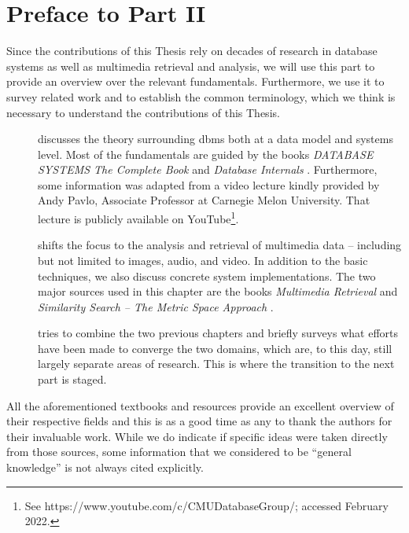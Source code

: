 \chapter*{Preface to Part II}

Since the contributions of this Thesis rely on decades of research in database systems as well as multimedia retrieval and analysis, we will use this part to provide an overview over the relevant fundamentals. Furthermore, we use it to survey related work and to establish the common terminology, which we think is necessary to understand the contributions of this Thesis.

\begin{description}
    \item[] discusses the theory surrounding \acrlong{dbms} both at a data model and systems level. Most of the fundamentals are guided by the books \emph{DATABASE SYSTEMS The Complete Book} \cite{Garcia:2009Database} and \emph{Database Internals} \cite{Petrov:2019Database}. Furthermore, some information was adapted from a video lecture kindly provided by Andy Pavlo, Associate Professor at Carnegie Melon University. That lecture is publicly available on YouTube\footnote{See https://www.youtube.com/c/CMUDatabaseGroup/; accessed February 2022.}.
    \item[] shifts the focus to the analysis and retrieval of multimedia data -- including but not limited to images, audio, and video. In addition to the basic techniques, we also discuss concrete system implementations. The two major sources used in this chapter are the books \emph{Multimedia Retrieval} \cite{Blanken:2007multimedia} and \emph{Similarity Search -- The Metric Space Approach} \cite{Zezula:2006Similarity}.
    \item[] tries to combine the two previous chapters and briefly surveys what efforts have been made to converge the two domains, which are, to this day, still largely separate areas of research. This is where the transition to the next part is staged.
\end{description}

All the aforementioned textbooks and resources provide an excellent overview of their respective fields and this is as a good time as any to thank the authors for their invaluable work. While we do indicate if specific ideas were taken directly from those sources, some information that we considered to be ``general knowledge'' is not always cited explicitly.